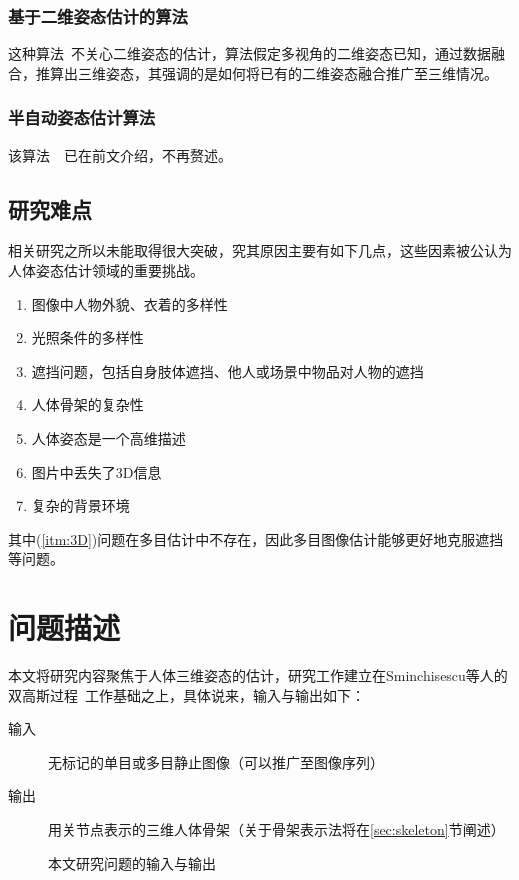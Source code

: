 \subsubsection{基于二维姿态估计的算法}
这种算法~\cite{burenius20133d}不关心二维姿态的估计，算法假定多视角的二维姿态已知，通过数据融合，推算出三维姿态，其强调的是如何将已有的二维姿态融合推广至三维情况。

\subsubsection{半自动姿态估计算法}
该算法~\cite{wei2009modeling}~\cite{wei2010videomocap}已在前文介绍，不再赘述。

\subsection{研究难点}
相关研究之所以未能取得很大突破，究其原因主要有如下几点，这些因素被公认为人体姿态估计领域的重要挑战。
\begin{enumerate}[(1)]
  \item 图像中人物外貌、衣着的多样性
  \item 光照条件的多样性
  \item 遮挡问题，包括自身肢体遮挡、他人或场景中物品对人物的遮挡
  \item 人体骨架的复杂性
  \item 人体姿态是一个高维描述
  \item \label{itm:3D}图片中丢失了3D信息
  \item 复杂的背景环境
\end{enumerate}

其中(\ref{itm:3D})问题在多目估计中不存在，因此多目图像估计能够更好地克服遮挡等问题。

\section{问题描述}
本文将研究内容聚焦于人体三维姿态的估计，研究工作建立在Sminchisescu等人的双高斯过程~\cite{bo2010twin}工作基础之上，具体说来，输入与输出如下：
\begin{description}
  \item[输入] 无标记的单目或多目静止图像（可以推广至图像序列）
  \item[输出] 用关节点表示的三维人体骨架（关于骨架表示法将在\ref{sec:skeleton}节阐述）
\end{description}


\begin{figure}[htbp]
    \centering
    \hspace{2cm}
    \caption{本文研究问题的输入与输出}
    \label{fig:inout}
\end{figure}



